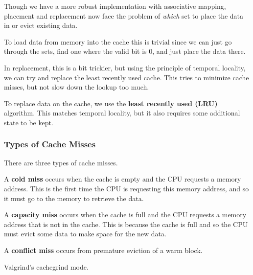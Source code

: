     Though we have a more robust implementation with associative mapping, placement and replacement now face the problem of \textit{which} set to place the data in or evict existing data. 

    \begin{theorem}[Placement]
      To load data from memory into the cache this is trivial since we can just go through the sets, find one where the valid bit is $0$, and just place the data there.  
    \end{theorem}

    In replacement, this is a bit trickier, but using the principle of temporal locality, we can try and replace the least recently used cache. This tries to minimize cache misses, but not slow down the lookup too much. 

    \begin{theorem}[Replacement]
      To replace data on the cache, we use the \textbf{least recently used (LRU)} algorithm. This matches temporal locality, but it also requires some additional state to be kept. 
    \end{theorem}

  \subsubsection{Types of Cache Misses} 

    There are three types of cache misses. 

    \begin{definition}
      A \textbf{cold miss} occurs when the cache is empty and the CPU requests a memory address. This is the first time the CPU is requesting this memory address, and so it must go to the memory to retrieve the data.
    \end{definition}
    
    \begin{definition}
      A \textbf{capacity miss} occurs when the cache is full and the CPU requests a memory address that is not in the cache. This is because the cache is full and so the CPU must evict some data to make space for the new data.
    \end{definition}

    \begin{definition}
      A \textbf{conflict miss} occurs from premature eviction of a warm block. 
    \end{definition}

  Valgrind's cachegrind mode. 


